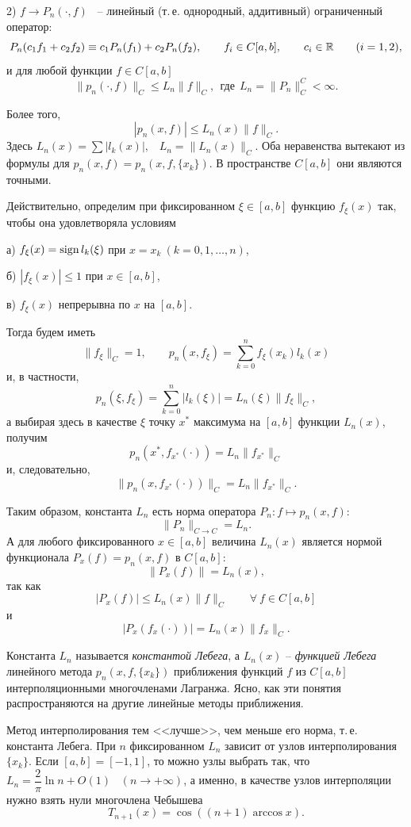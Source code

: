 2) $f \to P_n(\cdot,f)$
~-- линейный (т.\,е. однородный, аддитивный) ограниченный оператор:
$$
  P_n(c_1f_1+c_2f_2) \equiv c_1P_n(f_1)+c_2P_n(f_2),\qquad
  f_i\in C[a,b],\qquad c_i\in \mathbb{R}\qquad (i=1,2),
$$
и для любой функции
$f\in C[a,b]$
$$
  \|p_n(\cdot,f)\|_C \le L_n\|f\|_C,\ \ \mbox{где}\ \
  L_n=\|P_n\|_C^C<\infty.
$$

Более того,
$$
|p_n(x,f)| \le L_n(x)\|f\|_C.
$$
Здесь $L_n(x)=\sum{|l_k(x)|},$~ $L_n =
\|L_n(x)\|_C$. Оба неравенства вытекают из формулы для $p_n(x, f) = p_n(x,f,\{x_k\})$. В
пространстве $C[a,b]$ они являются точными.

{Действительно, определим
при фиксированном $\xi \in [a,b]$ функцию $f_\xi(x)$ так,
чтобы она удовлетворяла условиям}

{а) $f_\xi(x)={\rm sign \, }{l_k(\xi)}$ при $x=x_k\  ( k=0,1,\ldots,n)$,}

{б) $|f_\xi(x)| \le 1$ при $x \in [a,b]$,}

{в) $f_\xi(x)$ непрерывна по $x$ на $[a,b]$.}

{Тогда будем иметь
$$
\|f_\xi\|_C=1,
\qquad  p_n(x, f_\xi) = \sum\limits^n_{k=0}{f_\xi(x_k)l_k(x)}
$$
и, в частности,
$$
  p_n(\xi, f_\xi) = \sum\limits^n_{k=0}{|l_k(\xi)|} =
  L_n(\xi)\|f_\xi\|_C,
$$
а выбирая здесь в качестве $\xi$ точку $x^*$ максимума на $[a,b]$ функции $L_n(x)$,
получим
$$
  p_n(x^*,f_{x^*}(\cdot)) = L_n\|f_{x^*}\|_C
$$
и, следовательно,
$$
  \|p_n(x,f_{x^*}(\cdot))\|_C = L_n\|f_{x^*}\|_C.
$$}

{Таким образом, константа $L_n$ есть норма оператора $P_n\colon f \longmapsto p_n(x,f):$
$$
  \|P_n\|_{C \to C} = L_n.
$$
А для любого фиксированного $x \in [a,b]$ величина $L_n(x)$ является нормой функционала
$P_x(f)=p_n(x,f)$ в $C[a,b]$:
$$
\|P_x(f)\| = L_n(x),
$$
так как
$$
|P_x(f)| \le L_n(x)\|f\|_C\qquad \forall\ f \in C[a,b]
$$
и
$$
|P_x(f_x(\cdot))|=L_n(x)\|f_x\|_C.
$$}

{Константа $L_n$ называется \textit{константой Лебега}, а $L_n(x)$ --
\textit{функцией Лебега} линейного метода $p_n(x, f, \{x_k\})$ приближения функций $f$ из
$C[a,b]$ интерполяционными многочленами Лагранжа. Ясно, как эти понятия распространяются
на другие линейные методы приближения.}

{Метод интерполирования тем <<лучше>>, чем меньше его норма, т.\,е. константа Лебега. При
$n$ фиксированном $L_n$ зависит от узлов интерполирования $\{x_k\}$. Если $[a,b]=[-1,1]$,
то можно узлы выбрать так, что $L_n=\dfrac{2}{\pi}\ln{n} + O(1)$~ $(n \to +\infty)$, а
именно, в качестве узлов интерполяции нужно взять нули многочлена Чебышева
$$
T_{n+1}(x)=\cos({(n+1)}\arccos{x}).
$$}

